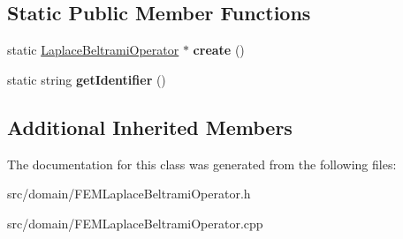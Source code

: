 \subsection*{Static Public Member Functions}
\begin{DoxyCompactItemize}
\item 
\hypertarget{class_f_e_m_laplace_beltrami_operator_ab33dd874f3e8810a5ccac3d8a5d86a2a}{}static \hyperlink{class_laplace_beltrami_operator}{Laplace\+Beltrami\+Operator} $\ast$ {\bfseries create} ()\label{class_f_e_m_laplace_beltrami_operator_ab33dd874f3e8810a5ccac3d8a5d86a2a}

\item 
\hypertarget{class_f_e_m_laplace_beltrami_operator_a94bfc4fd93c40e4825626b8116bd5759}{}static string {\bfseries get\+Identifier} ()\label{class_f_e_m_laplace_beltrami_operator_a94bfc4fd93c40e4825626b8116bd5759}

\end{DoxyCompactItemize}
\subsection*{Additional Inherited Members}


The documentation for this class was generated from the following files\+:\begin{DoxyCompactItemize}
\item 
src/domain/F\+E\+M\+Laplace\+Beltrami\+Operator.\+h\item 
src/domain/F\+E\+M\+Laplace\+Beltrami\+Operator.\+cpp\end{DoxyCompactItemize}

